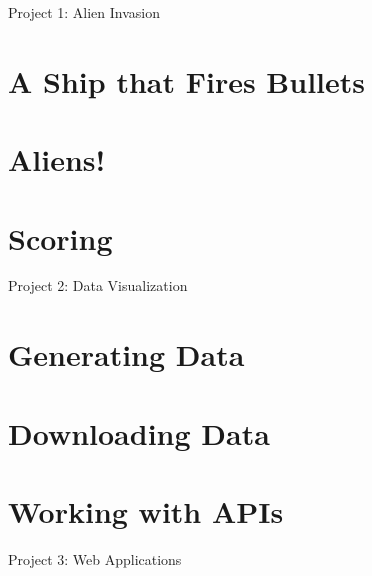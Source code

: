 \documentclass[oneside]{book}
\numberwithin{equation}{section}
\begin{document}
\begin{center}
	\Large Project 1: Alien Invasion
\end{center}

\section{A Ship that Fires Bullets}


\section{Aliens!}


\section{Scoring}


\begin{center}
	\Large Project 2: Data Visualization
\end{center}

\section{Generating Data}


\section{Downloading Data}


\section{Working with APIs}


\begin{center}
	\Large Project 3: Web Applications
\end{center}
\end{document}
